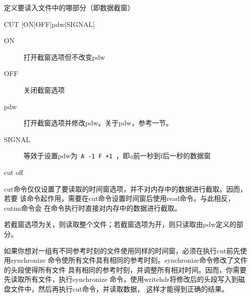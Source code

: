 \label{cmd:cut}

定义要读入文件中的哪部分（即数据截窗）

\begin{SACSTX}
CUT [ON|OFF|pdw|SIGNAL]
\end{SACSTX}

\begin{description}
\item [ON] 打开截窗选项但不改变pdw
\item [OFF] 关闭截窗选项
\item [pdw] 打开截窗选项并修改pdw。关于pdw，参考一节。
\item [SIGNAL] 等效于设置pdw为~\lstinline{A -1 F +1}~，即a前一秒到f后一秒的数据窗
\end{description}

\begin{SACDFT}
cut off
\end{SACDFT}

cut命令仅仅设置了要读取的时间窗选项，并不对内存中的数据进行截取。因而，若要
该命令起作用，需要在cut命令设置时间窗后使用read命令。与此相反，cutim命令会
在命令执行时直接对内存中的数据进行截取。

若截窗选项为关，则读取整个文件；若截窗选项为开，则只读取由pdw定义的部分。

如果你想对一组有不同参考时刻的文件使用同样的时间窗，必须在执行cut前先使用synchronize
命令使所有文件具有相同的参考时刻。synchronize命令修改了文件的头段使得所有文件
具有相同的参考时刻，并调整所有相对时间。因而，你需要先读取所有文件，执行synchronize
命令，使用writehdr将修改后的头段写入到磁盘文件中，然后再执行cut命令，并读取数据，
这样才能得到正确的结果。

